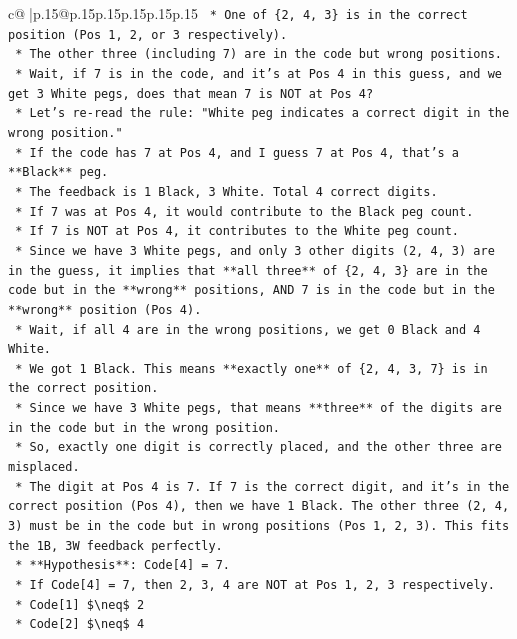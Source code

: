 \documentclass{article}
\begin{document}
{\begin{supertabular}{c@{$\;$}|p{.15\linewidth}@{}p{.15\linewidth}p{.15\linewidth}p{.15\linewidth}p{.15\linewidth}p{.15\linewidth}}
{{{\texttt{    *   One of \{2, 4, 3\} is in the correct position (Pos 1, 2, or 3 respectively).} \\
\texttt{    *   The other three (including 7) are in the code but wrong positions.} \\
\texttt{    *   Wait, if 7 is in the code, and it's at Pos 4 in this guess, and we get 3 White pegs, does that mean 7 is NOT at Pos 4?} \\
\texttt{    *   Let's re{-}read the rule: "White peg indicates a correct digit in the wrong position."} \\
\texttt{    *   If the code has 7 at Pos 4, and I guess 7 at Pos 4, that's a **Black** peg.} \\
\texttt{    *   The feedback is 1 Black, 3 White. Total 4 correct digits.} \\
\texttt{    *   If 7 was at Pos 4, it would contribute to the Black peg count.} \\
\texttt{    *   If 7 is NOT at Pos 4, it contributes to the White peg count.} \\
\texttt{    *   Since we have 3 White pegs, and only 3 other digits (2, 4, 3) are in the guess, it implies that **all three** of \{2, 4, 3\} are in the code but in the **wrong** positions, AND 7 is in the code but in the **wrong** position (Pos 4).} \\
\texttt{    *   Wait, if all 4 are in the wrong positions, we get 0 Black and 4 White.} \\
\texttt{    *   We got 1 Black. This means **exactly one** of \{2, 4, 3, 7\} is in the correct position.} \\
\texttt{    *   Since we have 3 White pegs, that means **three** of the digits are in the code but in the wrong position.} \\
\texttt{    *   So, exactly one digit is correctly placed, and the other three are misplaced.} \\
\texttt{    *   The digit at Pos 4 is 7. If 7 is the correct digit, and it's in the correct position (Pos 4), then we have 1 Black. The other three (2, 4, 3) must be in the code but in wrong positions (Pos 1, 2, 3). This fits the 1B, 3W feedback perfectly.} \\
\texttt{    *   **Hypothesis**: Code{[}4{]} = 7.} \\
\texttt{    *   If Code{[}4{]} = 7, then 2, 3, 4 are NOT at Pos 1, 2, 3 respectively.} \\
\texttt{        *   Code{[}1{]} \$\textbackslash{}neq\$ 2} \\
\texttt{        *   Code{[}2{]} \$\textbackslash{}neq\$ 4} \\
}}}
\end{supertabular}}
\end{document}
